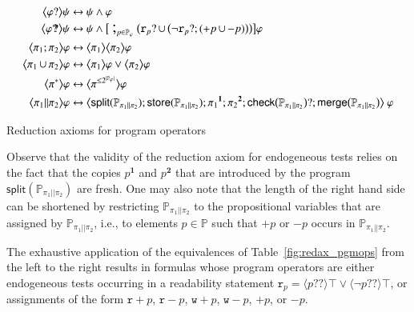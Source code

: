 \documentclass{llncs}
\newcommand{\progStore}{\mathsf{store}}
\newcommand{\progOkChange}{\mathsf{check}}
\newcommand{\progsplit}{\mathsf{split}}
\newcommand{\progmerge}{\mathsf{merge}}
\newcommand{\atm}{x}
\newcommand{\cp}[2]{{#2}^\mathbf{#1}}
\newcommand{\pll}{ {||} }							%
\newcommand{\readable}[1]{\mathtt{r}_{#1}}
\newcommand{\writable}[1]{\mathtt{w}_{#1}}
\newcommand{\testendo}{?\!\!?}			%
\newcommand{\testpdl}{?}				%
\newcommand{\assgntopR}[1]{{\mathtt r {+} #1}}
\newcommand{\assgnbotR}[1]{{\mathtt r {-} #1}}
\newcommand{\assgntopW}[1]{{\mathtt w {+} #1}}
\newcommand{\assgnbotW}[1]{{\mathtt w {-} #1}}
\newcommand{\assgntopV}[1]{{\mathtt {+} #1}}
\newcommand{\assgnbotV}[1]{{\mathtt {-} #1}}
\newcommand{\card}[1]{|#1|}
\newcommand{\lbox}[1]{ \big[ #1 \big] }
\newcommand{\ldia}[1]{ \big\langle #1 \big\rangle}
\newcommand{\leqv}{ \leftrightarrow }
\newcommand{\ndet}{\,{\cup}\,}
\renewcommand{\phi}{\varphi}
\newcommand{\propset}{\mathbb P}
\newcommand{\propsetOf}[1]{\propset_{#1}}
\newcommand{\seqseq}[1]{ \text{\Large ;}_{#1} ~ }
\begin{document}
\begin{table}[t]
\begin{align*}
\ldia{\phi \testpdl } \psi \leqv &\ \psi \land \phi
\\
\ldia{\phi \testendo } \psi \leqv &\ \psi \land \lbox{ ~ \seqseq{p \in \propsetOf \phi} \big(
\readable{p} \testpdl \ndet \big( \lnot \readable{p} \testpdl ; (\assgntopV{p} \ndet \assgnbotV{p}) \big) 
\big) } \phi
\\
\ldia{\pi_1 ; \pi_2}  \phi \leqv &\ \ldia{\pi_1 } \ldia{\pi_2}  \phi 
\\
\ldia{\pi_1 \ndet \pi_2}  \phi \leqv &\ \ldia{\pi_1 } \phi \lor \ldia{\pi_2}  \phi 
\\
\ldia{\pi^\ast}  \phi \leqv &\ \ldia{\pi^{\leq 2^{\card{\propsetOf{\phi}}}} }  \phi   
\\
\ldia{\pi_1 \pll \pi_2}  \phi \leqv &\ \ldia{ 
\progsplit( \propsetOf{\pi_1 \pll \pi_2} ) ; 
\progStore( \propsetOf{\pi_1 \pll \pi_2} ) ;
\cp 1 {\pi_1} ; \cp 2 {\pi_2} ; 
\progOkChange \big(\propsetOf{\pi_1 \pll \pi_2} \big) \testpdl ;
\progmerge \big(\propsetOf{\pi_1 \pll \pi_2} \big)
} ~ \phi 
\end{align*}
\caption{Reduction axioms for program operators
\label{fig:redax_pgmops}
}
\end{table}

Observe that the validity of the reduction axiom for endogeneous tests relies on the fact that the copies  
$\cp 1 p$ and $\cp 2 p$ that are introduced by the program 
$\progsplit( \propsetOf{\pi_1 \pll \pi_2} ) $ are fresh. 
%
%
One may also note that the length of the right hand side can be shortened by restricting 
$\propsetOf{\pi_1 \pll \pi_2}$ to the propositional variables that are assigned by $\propsetOf{\pi_1 \pll \pi_2}$, i.e., 
to elements $p \in \propset$ such that $\assgntopV p$ or $\assgnbotV p$ occurs in $\propsetOf{\pi_1 \pll \pi_2}$. 

The exhaustive application of the equivalences of Table~\ref{fig:redax_pgmops} from the left to the right 
results in formulas whose program operators are either endogeneous tests occurring in a readability statement
$\readable p = \ldia{p \testendo} \top \lor \ldia{\lnot p \testendo} \top$, or 
assignments of the form
$\assgntopR p $, $\assgnbotR p $,
$\assgntopW p $, $\assgnbotW p $, 
$\assgntopV p $, or $\assgnbotV p $. 
\end{document}
